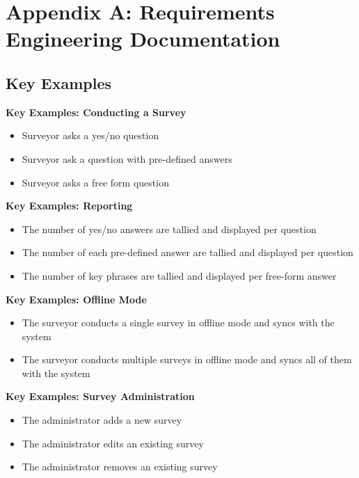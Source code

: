 \documentclass[12pt]{witseiepaper}
\begin{document}
\renewcommand{\bibname}{REFERENCES}
\renewcommand*{\bibfont}{\raggedright}




\newpage




\section{Appendix A: Requirements Engineering Documentation}

\subsection{Key Examples}

\textbf{Key Examples: Conducting a Survey}
\begin{itemize}
\item Surveyor asks a yes/no question 
\item Surveyor ask a question with pre-defined answers
\item Surveyor asks a free form question
\end{itemize}

\textbf{Key Examples: Reporting}
\begin{itemize}
\item The number of yes/no answers are tallied and displayed per question
\item The number of each pre-defined answer are tallied and displayed per question
\item The number of key phrases are tallied and displayed per free-form answer
\end{itemize}

\textbf{Key Examples: Offline Mode}
\begin{itemize}
\item The surveyor conducts a single survey in offline mode and syncs with the system
\item The surveyor conducts multiple surveys in offline mode and syncs all of them with the system
\end{itemize}

\textbf{Key Examples: Survey Administration}
\begin{itemize}
\item The administrator adds a new survey
\item The administrator edits an existing survey
\item The administrator removes an existing survey
\end{itemize}
\end{document}

